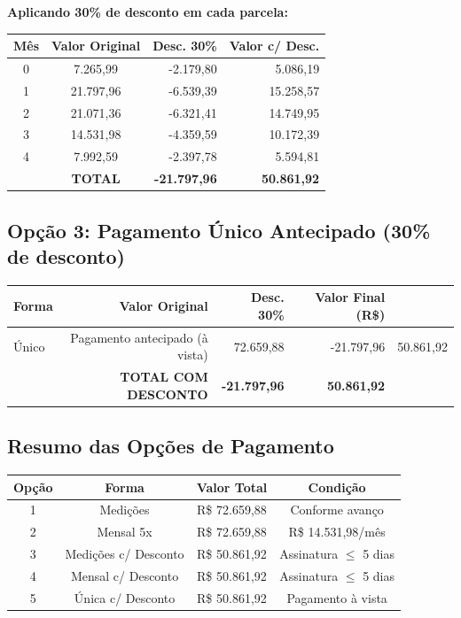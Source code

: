 \documentclass[12pt,a4paper]{article}
\renewenvironment{table}%
{\begin{center}%
\scriptsize%
\addtolength{\tabcolsep}{-2pt}%
}%
{\end{center}}
\begin{document}
\noindent\textbf{Aplicando 30\% de desconto em cada parcela:}

\begin{table}
\centering
\begin{tabular}{ccrr}
\toprule
\textbf{Mês} & \textbf{Valor Original} & \textbf{Desc. 30\%} & \textbf{Valor c/ Desc.} \\
\midrule
0 & 7.265,99 & -2.179,80 & 5.086,19 \\
1 & 21.797,96 & -6.539,39 & 15.258,57 \\
2 & 21.071,36 & -6.321,41 & 14.749,95 \\
3 & 14.531,98 & -4.359,59 & 10.172,39 \\
4 & 7.992,59 & -2.397,78 & 5.594,81 \\
\midrule
 & \textbf{TOTAL} & \textbf{-21.797,96} & \textbf{50.861,92} \\
\bottomrule
\end{tabular}
\end{table}

\subsection{Opção 3: Pagamento Único Antecipado (30\% de desconto)}

\begin{table}
\centering
\begin{tabular}{lrrr}
\toprule
\textbf{Forma} & \textbf{Valor Original} & \textbf{Desc. 30\%} & \textbf{Valor Final (R\$)} \\
\midrule
Único & Pagamento antecipado (à vista) & 72.659,88 & -21.797,96 & 50.861,92 \\
\midrule
 & \textbf{TOTAL COM DESCONTO} & \textbf{-21.797,96} & \textbf{50.861,92} \\
\bottomrule
\end{tabular}
\end{table}

\subsection{Resumo das Opções de Pagamento}

\begin{table}
\centering
\begin{tabular}{cccc}
\toprule
\textbf{Opção} & \textbf{Forma} & \textbf{Valor Total} & \textbf{Condição} \\
\midrule
1 & Medições & R\$ 72.659,88 & Conforme avanço \\
2 & Mensal 5x & R\$ 72.659,88 & R\$ 14.531,98/mês \\
3 & Medições c/ Desconto & R\$ 50.861,92 & Assinatura $\leq$ 5 dias \\
4 & Mensal c/ Desconto & R\$ 50.861,92 & Assinatura $\leq$ 5 dias \\
5 & Única c/ Desconto & R\$ 50.861,92 & Pagamento à vista \\
\bottomrule
\end{tabular}
\end{table}
\end{document}
